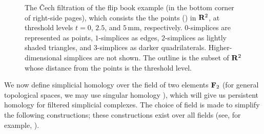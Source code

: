 \begin{figure}[tbp]
  \centering
  \begin{subfigure}{.3\textwidth}
    \centering
    
    \caption{}
    \label{F:Cech-low}
  \end{subfigure}
  \hfill
  \begin{subfigure}{.3\textwidth}
    \centering
    
    \caption{}
    \label{F:Cech-mid}
  \end{subfigure}
  \hfill
  \begin{subfigure}{.3\textwidth}
    \centering
    
    \caption{}
    \label{F:Cech-high}
  \end{subfigure}
  \caption[The Čech filtration of the flip book example at three threshold levels.]{The Čech filtration of the flip book example (in the bottom corner of right-side pages), which consists the the points () in $\R^2$, at threshold levels $t = 0$, $2.5$, and $5\,\textrm{mm}$, respectively.
  $0$-simplices are represented as points, $1$-simplices as edges, $2$-simplices as lightly shaded triangles, and $3$-simplices as darker quadrilaterals. Higher-dimensional simplices are not shown.
  The outline is the subset of $\R^2$ whose distance from the points is the threshold level\footnotemark.}
  \label{F:Cech}
\end{figure}


We now define simplicial homology over the field of two elements $\bf{F}_2$ (for general topological spaces, we may use singular homology \cite{Hatcher2002}), which will give us persistent homology for filtered simplicial complexes. The choice of field is made to simplify the following constructions; these constructions exist over all fields (see, for example, \cite{Hatcher2002}).

